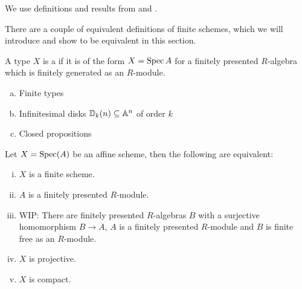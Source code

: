 We use definitions and results from \cite{draft} and \cite{proper-draft}.

There are a couple of equivalent definitions of finite schemes, which we will introduce and show to be equivalent in this section.

\begin{definition}
  A type $X$ is a  if it is of the form $X=\operatorname{Spec} A$ for a finitely presented $R$-algebra which is finitely generated as an $R$-module.
\end{definition}

\begin{example}
  \begin{enumerate}[(a)]
  \item Finite types
  \item Infinitesimal disks $\mathbb{D}_k(n)\subseteq\mathbb{A}^n$ of order $k$
  \item Closed propositions
  \end{enumerate}
\end{example}

\begin{theorem}
  \label{finite-scheme-characterization}
  Let $X=\operatorname{Spec}(A)$ be an affine scheme, then the following are equivalent:
  \begin{enumerate}[(i)]
  \item $X$ is a finite scheme.
  \item $A$ is a finitely presented $R$-module.
  \item WIP: There are finitely presented $R$-algebras $B$ with a surjective homomorphism $B\to A$, $A$ is a finitely presented $R$-module and $B$ is finite free as an $R$-module.
  \item $X$ is projective.
  \item $X$ is compact.
  \end{enumerate}
\end{theorem}

